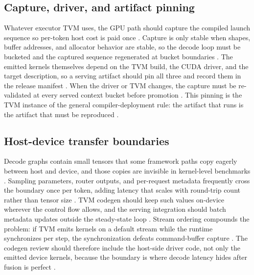\subsection{Capture, driver, and artifact pinning}

Whatever executor TVM uses, the GPU path should capture the compiled launch sequence so per-token host cost is paid once \citep{nvidia2024cudagraphs,memoryfloor2026}. Capture is only stable when shapes, buffer addresses, and allocator behavior are stable, so the decode loop must be bucketed and the captured sequence regenerated at bucket boundaries \citep{kwon2023vllm,patel2025llminference}. The emitted kernels themselves depend on the TVM build, the CUDA driver, and the target description, so a serving artifact should pin all three and record them in the release manifest \citep{chen2020compilerbasedhardw,taxbreak2026}. When the driver or TVM changes, the capture must be re-validated at every served context bucket before promotion \citep{memoryfloor2026,yirage2026}. This pinning is the TVM instance of the general compiler-deployment rule: the artifact that runs is the artifact that must be reproduced \citep{patel2025llminference,memoryfloor2026}.

\subsection{Host-device transfer boundaries}

Decode graphs contain small tensors that some framework paths copy eagerly between host and device, and those copies are invisible in kernel-level benchmarks \citep{kwon2023vllm,patel2025llminference}. Sampling parameters, router outputs, and per-request metadata frequently cross the boundary once per token, adding latency that scales with round-trip count rather than tensor size \citep{taxbreak2026,memoryfloor2026}. TVM codegen should keep such values on-device wherever the control flow allows, and the serving integration should batch metadata updates outside the steady-state loop \citep{chen2018tvm,patel2025llminference}. Stream ordering compounds the problem: if TVM emits kernels on a default stream while the runtime synchronizes per step, the synchronization defeats command-buffer capture \citep{nvidia2024cudagraphs,memoryfloor2026}. The codegen review should therefore include the host-side driver code, not only the emitted device kernels, because the boundary is where decode latency hides after fusion is perfect \citep{chen2020compilerbasedhardw,patel2025llminference}.

